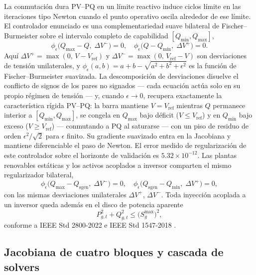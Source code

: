 La conmutación dura PV--PQ en un límite reactivo induce ciclos límite en las iteraciones tipo Newton cuando el punto operativo oscila alrededor de ese límite. El controlador enunciado es una complementariedad suave bilateral de Fischer--Burmeister sobre el intervalo completo de capabilidad $[Q_{\min}, Q_{\max}]$,
\begin{equation}
\phi_\epsilon\bigl(Q_{\max} - Q,\; \Delta V^{-}\bigr) = 0, \quad
\phi_\epsilon\bigl(Q - Q_{\min},\; \Delta V^{+}\bigr) = 0.
\label{eq:qbound}
\end{equation}
Aquí $\Delta V^{+} = \max(0,\, V - V_{\mathrm{ref}})$ y $\Delta V^{-} = \max(0,\, V_{\mathrm{ref}} - V)$ son desviaciones de tensión unilaterales, y $\phi_\epsilon(a, b) = a + b - \sqrt{a^2 + b^2 + \epsilon^2}$ es la función de Fischer--Burmeister suavizada. La descomposición de desviaciones disuelve el conflicto de signos de los pares no signados --- cada ecuación actúa solo en su propio régimen de tensión --- y, cuando $\epsilon \to 0$, recupera exactamente la característica rígida PV--PQ: la barra mantiene $V = V_{\mathrm{ref}}$ mientras $Q$ permanece interior a $[Q_{\min}, Q_{\max}]$, se congela en $Q_{\max}$ bajo déficit ($V \le V_{\mathrm{ref}}$) y en $Q_{\min}$ bajo exceso ($V \ge V_{\mathrm{ref}}$) --- conmutando a PQ al saturarse --- con un piso de residuo de orden $\epsilon^2/\sqrt{2}$ para $\epsilon$ finito. Su gradiente suavizado entra en la Jacobiana y mantiene diferenciable el paso de Newton. El error medido de regularización de este controlador sobre el horizonte de validación es $5.32 \times 10^{-12}$. Las plantas renovables estáticas y los activos acoplados a inversor comparten el mismo regularizador bilateral,
\begin{equation}
\phi_\epsilon\bigl(Q_{\max} - Q_{\mathrm{sgen}},\; \Delta V^{-}\bigr) = 0, \quad
\phi_\epsilon\bigl(Q_{\mathrm{sgen}} - Q_{\min},\; \Delta V^{+}\bigr) = 0,
\label{eq:qsgen}
\end{equation}
con las mismas desviaciones unilaterales $\Delta V^{+}$, $\Delta V^{-}$. Toda inyección acoplada a un inversor queda además en el disco de potencia aparente
\begin{equation}
P_{g,t}^{2} + Q_{g,t}^{2} \le \bigl(S_{g}^{\max}\bigr)^{2},
\label{eq:capability}
\end{equation}
conforme a IEEE Std 2800-2022 \cite{ieee2800} e IEEE Std 1547-2018 \cite{ieee1547}.

\subsection{Jacobiana de cuatro bloques y cascada de solvers}
\label{sub:jacobian}

